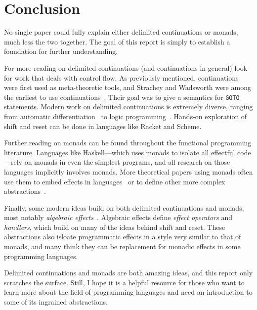 \documentclass[acmsmall, nonacm, screen]{acmart}
\begin{document}
\section{Conclusion} \label{sec:conclusion}
No single paper could fully explain either delimited continuations or monads, much less the two
together. The goal of this report is simply to establish a foundation for further understanding.

For more reading on delimited continuations (and continuations in general) look for work that
deals with control flow. As previously mentioned, continuations were first used as meta-theoretic
tools, and Strachey and Wadsworth were among the earliest to use
continuations~\cite{strachey2000continuations}. Their goal was to give a semantics for
\texttt{GOTO} statements. Modern work on delimited continuations is extremely diverse, ranging
from automatic differentiation~\cite{wang2019demystifying} to logic
programming~\cite{schrijvers2013delimited}. Hands-on exploration of shift and reset can be done
in languages like Racket and Scheme.

Further reading on monads can be found throughout the functional programming literature.
Languages like Haskell---which uses monads to isolate all effectful code---rely on monads in even
the simplest programs, and all research on those languages implicitly involves monads. More
theoretical papers using monads often use them to embed effects in
languages~\cite{paykin2017linearity} or to define other more complex
abstractions~\cite{xia2019interaction}.

Finally, some modern ideas build on both delimited continuations and monads, most notably {\em
algebraic effects}~\cite{bauer2015programming}. Algebraic effects define {\em effect operators}
and {\em handlers}, which build on many of the ideas behind shift and reset. These abstractions
also isloate programmatic effects in a style very similar to that of monads, and many think they
can be replacement for monadic effects in some programming languages.

Delimited continuations and monads are both amazing ideas, and this report only scratches the
surface. Still, I hope it is a helpful resource for those who want to learn more about the field
of programming languages and need an introduction to some of its ingrained abstractions.



\end{document}
